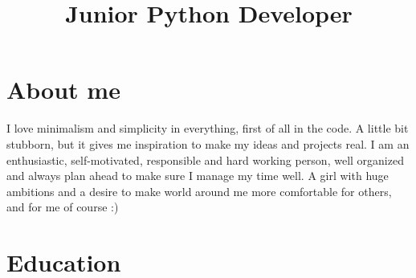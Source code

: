 \documentclass[12pt,a4paper,sans]{moderncv} %
\title{Junior Python Developer}
\begin{document}


% 
% 
% 
% 
% 


\makecvtitle %


\section{About me}

I love minimalism and simplicity in everything, first of all in the code. A little bit stubborn, but it gives me inspiration to make my ideas and projects real. I am an enthusiastic, self-motivated, responsible and hard working person, well organized and always plan ahead to make sure I manage my time well. 
A girl with huge ambitions and a desire to make world around me more comfortable for others, and for me of course :)


\section{Education}
\end{document}
